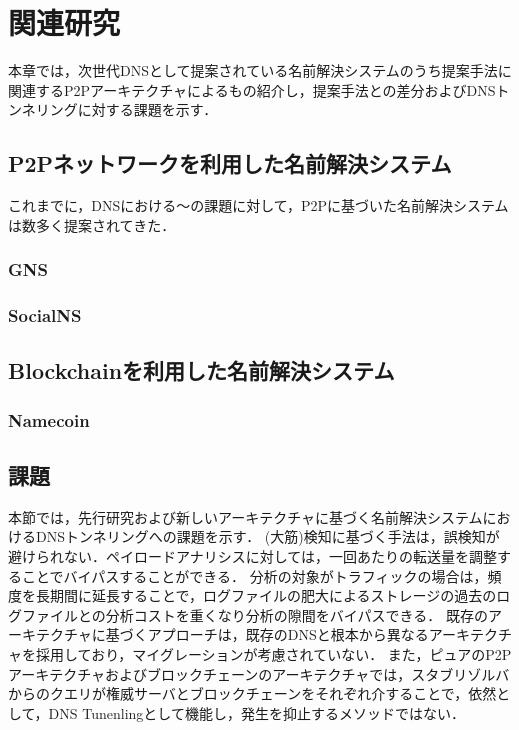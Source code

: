 \section{関連研究}
\label{sec:related-works}
本章では，次世代DNSとして提案されている名前解決システムのうち提案手法に関連するP2Pアーキテクチャによるもの紹介し，提案手法との差分およびDNSトンネリングに対する課題を示す．
\subsection{P2Pネットワークを利用した名前解決システム}
これまでに，DNSにおける〜の課題に対して，P2Pに基づいた名前解決システムは数多く提案されてきた．
\subsubsection{GNS}
\subsubsection{SocialNS}
\subsection{Blockchainを利用した名前解決システム}
\subsubsection{Namecoin}
\subsection{課題}
\label{sec:issue-past-works}
本節では，先行研究および新しいアーキテクチャに基づく名前解決システムにおけるDNSトンネリングへの課題を示す．
(大筋)検知に基づく手法は，誤検知が避けられない．ペイロードアナリシスに対しては，一回あたりの転送量を調整することでバイパスすることができる．
分析の対象がトラフィックの場合は，頻度を長期間に延長することで，ログファイルの肥大によるストレージの過去のログファイルとの分析コストを重くなり分析の隙間をバイパスできる．
既存のアーキテクチャに基づくアプローチは，既存のDNSと根本から異なるアーキテクチャを採用しており，マイグレーションが考慮されていない．
また，ピュアのP2Pアーキテクチャおよびブロックチェーンのアーキテクチャでは，スタブリゾルバからのクエリが権威サーバとブロックチェーンをそれぞれ介することで，依然として，DNS Tunenlingとして機能し，発生を抑止するメソッドではない．
